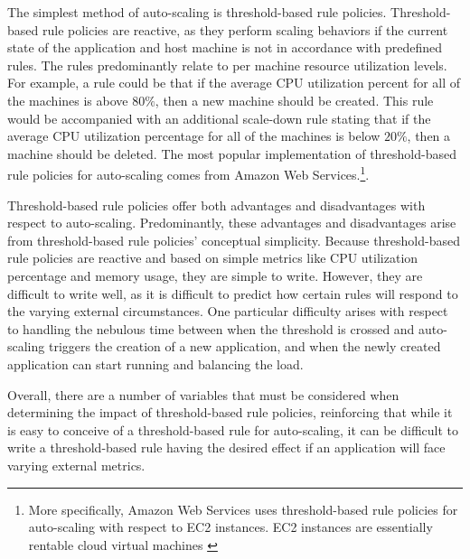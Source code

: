 The simplest method of auto-scaling is threshold-based rule policies.
Threshold-based rule policies are reactive, as they perform scaling behaviors if
the current state of the application and host machine
is not in accordance with predefined rules. The rules
predominantly relate to per machine resource utilization levels. For example, a
rule could be that if the average CPU utilization percent for all of the
machines is above $80\%$, then a new machine should be created. This rule would
be accompanied with an additional scale-down rule stating that if the average
CPU utilization percentage for all of the machines is below $20\%$, then a machine
should be deleted. The most popular implementation of threshold-based rule
policies for auto-scaling comes from Amazon Web Services.\footnote{More
specifically, Amazon Web Services uses threshold-based rule policies for
auto-scaling with respect to EC2 instances. EC2 instances are essentially
rentable cloud
virtual machines \cite{amazon-ec2}}\cite{amazon-auto-scaling-developer-guide}.

Threshold-based rule policies offer both advantages and disadvantages with
respect to auto-scaling. Predominantly, these advantages and disadvantages arise
from threshold-based rule policies' conceptual simplicity.
Because threshold-based rule policies are reactive and based on simple metrics
like CPU utilization percentage and memory usage, they are simple to write.
However, they are difficult to write well, as it is difficult to predict how
certain rules will respond to the varying external circumstances. One particular
difficulty arises with respect to handling the nebulous time between when the
threshold is crossed and auto-scaling triggers the creation of a new
application, and when the newly created application can start running and
balancing the load.

Overall, there are a number of variables that must be considered when
determining the impact of threshold-based rule policies, reinforcing
that while it is easy to conceive of a threshold-based rule for auto-scaling,
it can be difficult to write a threshold-based rule having the desired effect if
an application will face varying external metrics.


